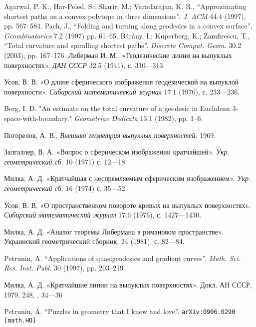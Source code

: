 \begin{thebibliography}{99}
Agarwal, P. K.; Har-Peled, S.; Sharir, M.; Varadarajan, K. R.,
``Approximating shortest paths on a convex polytope in three dimensions''.
\textit{J. ACM}
44.4 (1997),
pp. 567--584.
Pach, J.,
``Folding and turning along geodesics in a convex surface'',
\textit{Geombinatorics}
7.2 (1997)
pp. 61--65.
B{\'a}r{\'a}ny, I.; Kuperberg, K.; Zamfirescu, T.,
``Total curvature and spiralling shortest paths''.
\textit{Discrete Comput. Geom.}
30.2 (2003),
pp. 167--176.
Либерман И. М.,
«Геодезические
 линии
 на
 выпуклых
 поверхностях»,
\textit{ДАН СССР}
32.5 (1941),
с. 310---313. 

Усов, В. В. 
«О длине сферического изображения геодезической на выпуклой поверхности». \textit{Сибирский математический журнал} 
17.1 (1976), 
с. 233---236.

Berg, I. D. 
"An estimate on the total curvature of a geodesic in Euclidean 3-space-with-boundary." 
\textit{Geometriae Dedicata} 
13.1 (1982),
pp. 1--6.

Погорелов, А. В., 
\textit{Внешняя геометрия выпуклых поверхностей.} 
1969.

Залгаллер, В. А. 
«Вопрос о сферическом изображении кратчайшей».
\textit{Укр. геометрический сб.}
10 (1971) 
с. 12---18.

Милка, А. Д. 
«Кратчайшая с неспрямляемым сферическим изображением». 
\textit{Укр. геометрический сб.} 16 (1974)
с. 35---52.

Усов, В. В. 
«О пространственном повороте кривых на выпуклых поверхностях». 
\textit{Сибирский математический журнал}
17.6 (1976),
с. 1427---1430.

Милка, А. Д. 
«Аналог теоремы Либермана в римановом пространстве».
Украинский геометрический сборник,
24 (1981), 
с. 82---84,

Petrunin, A.
``Applications of quasigeodesics and gradient curves''.
\textit{Math. Sci. Res. Inst. Publ.}
30 (1997),
pp. 203--219

  Милка, А. Д. «Кратчайшие  линии  на  выпуклых  поверхностях».  Докл.  АН  СССР,   1979,   248, ,  34---36  

Petrunin, A.
``Puzzles in geometry that I know and love''.
\texttt{arXiv:0906.0290 [math.HO]}
\end{thebibliography}
